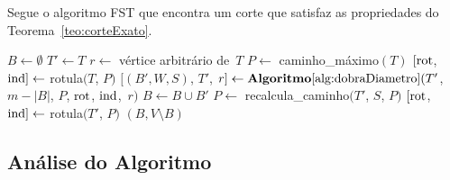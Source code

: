 


		Segue o algoritmo FST que encontra um corte que satisfaz as 
		propriedades do Teorema~\ref{teo:corteExato}.
		
		\bigskip

		\begin{algorithm}[H]
		\label{alg:corteExato}

			\caption{}
			$B\gets \emptyset$\;
			$T'\gets T$\;
			$r\gets$ vértice arbitrário de~$T$\;
			$P\gets$ {\sc caminho\_máximo}$(T)$\;
			$[\mathrm{rot}$, $\mathrm{ind}]\gets$ {\sc rotula}$(T$, $P)$\;
			{
				$[(B',W,S)$, $T'$, $r]\gets
					\mathbf {Algoritmo\ref{alg:dobraDiametro}}(T'$,
					$m-|B|$, $P$, $\mathrm{rot}$, $\mathrm{ind}$,~$r)$\;
				$B\gets B\cup B'$\;
				$P\gets$ {\sc recalcula\_caminho}$(T'$, $S$, $P)$\;
				$[\mathrm{rot}$, $\mathrm{ind}]\gets$ {\sc rotula}$(T'$, $P)$
			}
			\Return $(B,V\setminus B)$\;

		\end{algorithm}	

		\bigskip

		\subsection*{Análise do Algoritmo}


